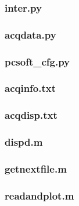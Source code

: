 \subsubsection[inter.py]{inter.py}

\subsubsection[acqdata.py]{acqdata.py}

\subsubsection[pcsoft\_cfg.py]{pcsoft\_cfg.py}

\subsubsection[acqinfo.txt]{acqinfo.txt}

\subsubsection[acqdisp.txt]{acqdisp.txt}

\subsubsection[dispd.m]{dispd.m}

\subsubsection[getnextfile.m]{getnextfile.m}

\subsubsection[readandplot.m]{readandplot.m}

